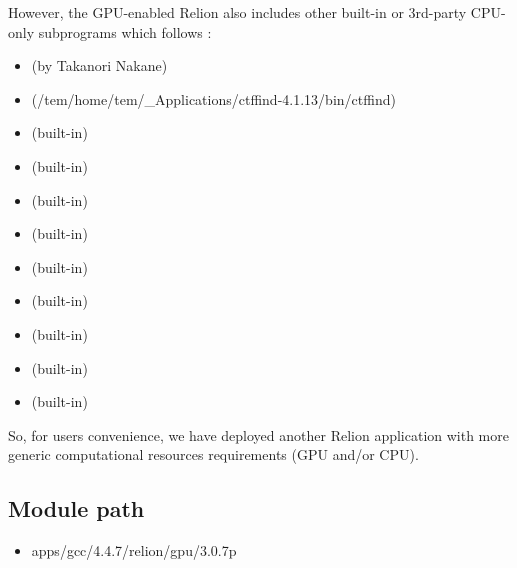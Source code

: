 \documentclass[letterpaper,10pt,english]{sphinxmanual}
\begin{document}
However, the GPU-enabled Relion also includes other built-in or 3rd-party CPU-only subprograms which follows :
\begin{itemize}
\item {} 
 (by Takanori Nakane)

\item {} 
 (/tem/home/tem/\_Applications/ctffind-4.1.13/bin/ctffind)

\item {} 
 (built-in)

\item {} 
 (built-in)

\item {} 
 (built-in)

\item {} 
 (built-in)

\item {} 
 (built-in)

\item {} 
 (built-in)

\item {} 
 (built-in)

\item {} 
 (built-in)

\item {} 
 (built-in)

\end{itemize}

So, for users convenience, we have deployed another Relion application with more generic computational resources requirements (GPU and/or CPU).


\subsection{Module path}
\label{\detokenize{relion:module-path}}\begin{itemize}
\item {} 
apps/gcc/4.4.7/relion/gpu/3.0.7p

\end{itemize}
\end{document}
